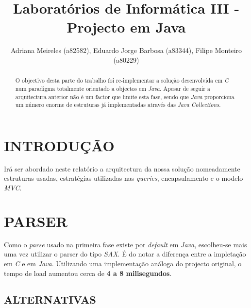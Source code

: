 \documentclass[letterpaper, 10 pt, conference]{IEEEtran} %
\title{\LARGE \bf
Laboratórios de Informática III - Projecto em Java
}
\author{Adriana Meireles (a82582), Eduardo Jorge Barbosa (a83344), Filipe Monteiro (a80229)%
}
\begin{document}
\maketitle
\thispagestyle{empty}
\pagestyle{empty}


\begin{abstract}

O objectivo desta parte do trabalho foi re-implementar a solução desenvolvida em \textit{C} num paradigma totalmente orientado a objectos em \textit{Java}. Apesar de seguir a arquitectura anterior não é um factor que limite esta fase, sendo que \textit{Java} proporciona um número enorme de estruturas já implementadas através das \textit{Java Collections}.

\end{abstract}


\section{INTRODUÇÃO}

Irá ser abordado neste relatório a arquitectura da nossa solução nomeadamente estruturas usadas, estratégias utilizadas nas \textit{queries}, encapsulamento e o modelo \textit{MVC}.


\section{PARSER}

Como o \textit{parse} usado na primeira fase existe por \textit{default} em \textit{Java}, escolheu-se mais uma vez utilizar o parser do tipo \textit{SAX}.
É do notar a diferença entre a impletação em \textit{C} e em \textit{Java}. Utilizando uma implementação análoga do projecto original, o tempo de load aumentou cerca de \textbf{4 a 8 milisegundos}.

\subsection{ALTERNATIVAS}
\end{document}
